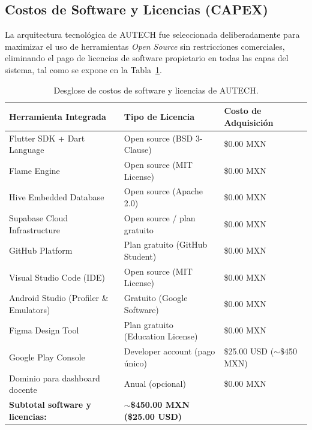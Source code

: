 \subsection{Costos de Software y Licencias (CAPEX)}
\label{subsec:costos_software}

La arquitectura tecnológica de AUTECH fue seleccionada deliberadamente para maximizar el uso de herramientas \textit{Open Source} sin restricciones comerciales, eliminando el pago de licencias de software propietario en todas las capas del sistema, tal como se expone en la Tabla~\ref{tab:costos_software}.

\begin{table}[htbp]
\centering
\caption{Desglose de costos de software y licencias de AUTECH.}
\label{tab:costos_software}
\setlength{\tabcolsep}{4pt}
\renewcommand{\arraystretch}{1.2}
\scriptsize
\begin{tabularx}{\textwidth}{@{} >{\raggedright\arraybackslash}X >{\raggedright\arraybackslash}p{4cm} >{\raggedleft\arraybackslash}p{3.8cm} @{}}
\toprule
\textbf{Herramienta Integrada} &
\textbf{Tipo de Licencia} &
\textbf{Costo de Adquisición} \\
\midrule

Flutter SDK + Dart Language
  & Open source (BSD 3-Clause)        & \$0.00 MXN \\

Flame Engine
  & Open source (MIT License)         & \$0.00 MXN \\

Hive Embedded Database
  & Open source (Apache 2.0)          & \$0.00 MXN \\

Supabase Cloud Infrastructure
  & Open source / plan gratuito       & \$0.00 MXN \\

GitHub Platform
  & Plan gratuito (GitHub Student)    & \$0.00 MXN \\

Visual Studio Code (IDE)
  & Open source (MIT License)         & \$0.00 MXN \\

Android Studio (Profiler \& Emulators)
  & Gratuito (Google Software)        & \$0.00 MXN \\

Figma Design Tool
  & Plan gratuito (Education License) & \$0.00 MXN \\

Google Play Console
  & Developer account (pago único)    & \$25.00 USD (${\sim}$\$450 MXN) \\

Dominio para dashboard docente
  & Anual (opcional)                  & \$0.00 MXN \\

\midrule
\multicolumn{2}{@{} >{\raggedright\arraybackslash}p{10cm}}%
  {\textbf{Subtotal software y licencias:}} &
  ${\sim}$\textbf{\$450.00 MXN (\$25.00 USD)} \\

\bottomrule
\end{tabularx}
\end{table}

